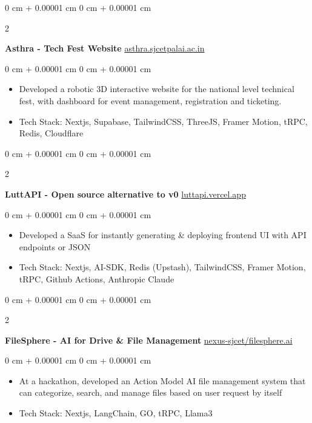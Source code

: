 \documentclass[10pt, letterpaper]{article}
\newenvironment{highlights}{
    \begin{itemize}[
        topsep=0.10 cm,
        parsep=0.10 cm,
        partopsep=0pt,
        itemsep=0pt,
        leftmargin=0 cm + 10pt
    ]
}{
    \end{itemize}
} %
\newenvironment{onecolentry}{
    \begin{adjustwidth}{
        0 cm + 0.00001 cm
    }{
        0 cm + 0.00001 cm
    }
}{
    \end{adjustwidth}
} %
\newenvironment{twocolentry}[2][]{
    \onecolentry
    \def\secondColumn{#2}
    \setcolumnwidth{\fill, 4.5 cm}
    \begin{paracol}{2}
}{
    \switchcolumn \raggedleft \secondColumn
    \end{paracol}
    \endonecolentry
} %
\begin{document}
\vspace{0.2 cm}

\begin{twocolentry}{
		\href{https://asthra.sjcetpalai.ac.in}{asthra.sjcetpalai.ac.in}
	}
	\textbf{Asthra - Tech Fest Website}\end{twocolentry}

\vspace{0.10 cm}
\begin{onecolentry}
	\begin{highlights}
		\item Developed a robotic 3D interactive website for the national level technical
		fest, with dashboard for event management, registration and ticketing.
		\item Tech Stack: Nextjs, Supabase, TailwindCSS, ThreeJS, Framer Motion, tRPC, Redis,
		Cloudflare
	\end{highlights}
\end{onecolentry}

\vspace{0.2 cm}

\begin{twocolentry}{
		\href{https://luttapi.vercel.app/}{luttapi.vercel.app}
	}
	\textbf{LuttAPI - Open source alternative to v0}\end{twocolentry}

\vspace{0.10 cm}
\begin{onecolentry}
	\begin{highlights}
		\item Developed a SaaS for instantly generating \& deploying frontend UI with API
		endpoints or JSON
		\item Tech Stack: Nextjs, AI-SDK, Redis (Upstash), TailwindCSS, Framer Motion, tRPC,
		Github Actions, Anthropic Claude
	\end{highlights}
\end{onecolentry}

\vspace{0.2 cm}

\begin{twocolentry}{
		\href{https://github.com/nexus-sjcet/filesphere.ai}{nexus-sjcet/filesphere.ai}
	}
	\textbf{FileSphere - AI for Drive \& File Management}\end{twocolentry}

\vspace{0.10 cm}
\begin{onecolentry}
	\begin{highlights}
		\item At a hackathon, developed an Action Model AI file management system that can
		categorize, search, and manage files based on user request by itself
		\item Tech Stack: Nextjs, LangChain, GO, tRPC, Llama3
	\end{highlights}
\end{onecolentry}
\vspace{0.2 cm}
\end{document}
